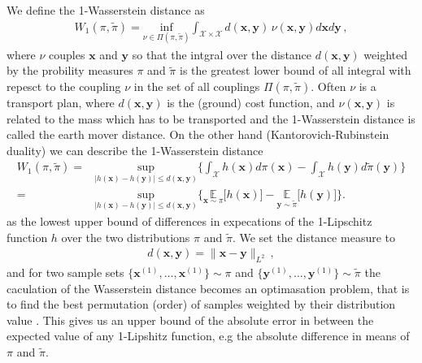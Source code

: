 We define the 1-Wasserstein distance as
\begin{align}
	W_1(\pi,\tilde{\pi}) = \underset{  \nu \in \Pi(\pi,\tilde{\pi}) }{ \text{inf}}\int_{\mathcal{X} \times \mathcal{X}} d(\bm{x},\bm{y}) \, \nu(\bm{x},\bm{y}) d\bm{x} d\bm{y} 
	\label{eq:wass} \, ,
\end{align}
where $\nu$ couples $\bm{x}$ and $\bm{y}$ so that the intgral over the distance $ d(\bm{x},\bm{y}) $ weighted by the probility measures $\pi$ and $\tilde{\pi}$ is the greatest lower bound of all integral with repesct to the coupling $\nu$ in the set of all couplings $ \Pi(\pi,\tilde{\pi})$.
Often $\nu$ is a transport plan, where $d(\bm{x}, \bm{y})$ is the (ground) cost function, and $\nu(\bm{x}, \bm{y})$ is related to the mass which has to be transported and the 1-Wasserstein distance is called the earth mover distance.
On the other hand (Kantorovich-Rubinstein duality) we can describe the 1-Wasserstein distance 
\begin{align}
	W_1(\pi,\tilde{\pi})  =&\underset{ |h(\bm{x}) - h(\bm{y})| \leq  d(\bm{x},\bm{y}) }{ \text{sup}} \Bigg\{  \int_{\mathcal{X}} h(\bm{x}) d \pi (\bm{x})  - \int_{\mathcal{X}} h(\bm{y}) d \tilde{\pi} (\bm{y}) \Bigg\} \\
		=&\underset{ |h(\bm{x}) - h(\bm{y})| \leq  d(\bm{x},\bm{y}) }{ \text{sup}}  \Bigg\{  \underset{\bm{x} \sim  \pi }{\mathbb{E}} \big[ h(\bm{x}) \big]  -  \underset{\bm{y} \sim \tilde{\pi}}{\mathbb{E}} \big[ h(\bm{y}) \big] \Bigg\} .
\end{align}
as the lowest upper bound of differences in expecations of the 1-Lipschitz function $h$ over the two distributions $\pi$ and $\tilde{\pi}$.
We set the distance measure to
\begin{align}
 d(\bm{x},\bm{y})= \lVert \bm{x} - \bm{y} \rVert_{L^2} \, ,
\end{align}
and for two sample sets $\{ \bm{x}^{(1)},\dots,\bm{x}^{(1)}\} \sim \pi$ and $\{ \bm{y}^{(1)},\dots,\bm{y}^{(1)}\} \sim \tilde{\pi}$ the caculation of the Wasserstein distance becomes an optimasation problem, that is to find the best permutation (order) of samples weighted by their distribution value \cite{feydy2020OT}.
This gives us an upper bound of the absolute error in between the expected value of any 1-Lipshitz function, e.g the absolute difference in means of $\pi$ and $\tilde{\pi}$. 


